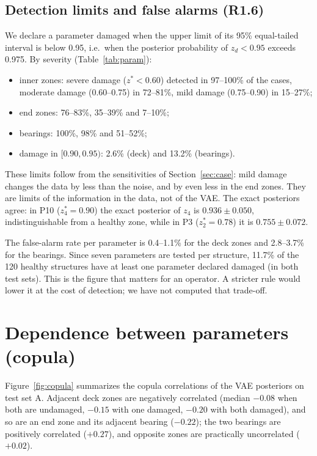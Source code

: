 \documentclass[11pt]{article}
\begin{document}
\subsection{Detection limits and false alarms (R1.6)}
We declare a parameter damaged when the upper limit of its 95\% equal-tailed interval is below 0.95, i.e.\ when the
posterior probability of $z_d<0.95$ exceeds 0.975. By severity (Table~\ref{tab:param}):
\begin{itemize}
\item inner zones: severe damage ($z^*<0.60$) detected in 97--100\% of the cases, moderate damage (0.60--0.75) in
72--81\%, mild damage (0.75--0.90) in 15--27\%;
\item end zones: 76--83\%, 35--39\% and 7--10\%;
\item bearings: 100\%, 98\% and 51--52\%;
\item damage in $[0.90,0.95)$: 2.6\% (deck) and 13.2\% (bearings).
\end{itemize}
These limits follow from the sensitivities of Section~\ref{sec:case}: mild damage changes the data by less than the
noise, and by even less in the end zones. They are limits of the information in the data, not of the VAE. The exact
posteriors agree: in P10 ($z_4^*=0.90$) the exact posterior of $z_4$ is $0.936\pm0.050$, indistinguishable from a
healthy zone, while in P3 ($z_2^*=0.78$) it is $0.755\pm0.072$.

The false-alarm rate per parameter is 0.4--1.1\% for the deck zones and 2.8--3.7\% for the bearings. Since seven
parameters are tested per structure, 11.7\% of the 120 healthy structures have at least one parameter declared
damaged (in both test sets). This is the figure that matters for an operator. A stricter rule would lower it at the
cost of detection; we have not computed that trade-off.

\section{Dependence between parameters (copula)}\label{sec:copula}
Figure~\ref{fig:copula} summarizes the copula correlations of the VAE posteriors on test set A. Adjacent deck zones
are negatively correlated (median $-0.08$ when both are undamaged, $-0.15$ with one damaged, $-0.20$ with both
damaged), and so are an end zone and its adjacent bearing ($-0.22$); the two bearings are positively correlated
($+0.27$), and opposite zones are practically uncorrelated ($+0.02$).
\end{document}
